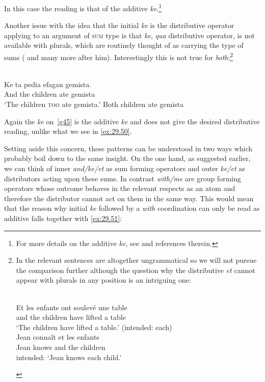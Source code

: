 \documentclass[output=paper]{langsci/langscibook}
\begin{document}
In this case the reading is that of the additive \emph{ke}.\footnote{For more
details on the additive \emph{ke}, see \citet{cms:15} and references therein.}

Another issue with the idea that the initial \emph{ke} is the distributive
operator applying to an argument of \textsc{sum} type is that \emph{ke}, \emph{qua}
distributive operator, is not available with plurals, which are routinely
thought of as carrying the type of sums (\cite{link2} and many more after him).
Interestingly this is not true for  \emph{both}:\footnote{In
     the relevant sentences are altogether ungrammatical so we will
    not pursue the comparison further although the question why the
    distributive \emph{et} cannot appear with plurals in any position is an
    intriguing one:

\begin{exe}\label{ex:29.47}
     \\
    \gll     \llap{*}Et les enfants ont soulev\'{e} une table\\
             and the children have lifted a table\\
    \glt     \enquote*{The children have lifted a table.} (intended: each)
%
     \label{ex:29.48}\\
    \gll     \llap{*}Jean conna\^{i}t et les enfants\\
             Jean knows and the children \\
    \glt     intended: \enquote*{Jean knows each child.}
\end{exe}}

\ea\label{ex:29.49} \\
	\gll    Ke ta pedia efagan gemista.\\
            And the children ate gemista\\ \label{g45}
    \glt    \enquote*{The children \textsc{too} ate gemista.}
\ex\label{ex:29.50}
    Both children ate gemista
\z

Again the \emph{ke} on~\eqref{g45} is the additive \emph{ke} and does not give
the desired distributive reading, unlike what we see in \eqref{ex:29.50}.

Setting aside this concern, these patterns can be understood in two ways which
probably boil down to the same insight. On the one hand, as suggested earlier,
we can think of inner \emph{and/ke/et} as sum forming operators and outer
\emph{ke/et} as distributors acting upon these sums. In contrast \emph{with/me}
are group forming operators whose outcome behaves in the relevant respects as
an atom and therefore the distributor cannot act on them in the same way. This
would mean that the reason why initial \emph{ke} followed by a \emph{with}
coordination can only be read as additive falls together with
\eqref{ex:29.51}:
\end{document}
